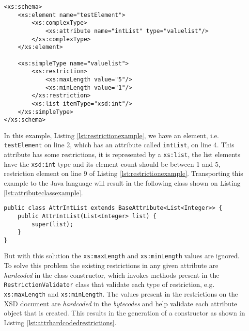 \bigskip


\begin{minipage}{\linewidth}
\begin{lstlisting}[caption={Restrictions Example XSD},captionpos=b,label={lst:restrictionexample}]
<xs:schema>
    <xs:element name="testElement">
        <xs:complexType>
            <xs:attribute name="intList" type="valuelist"/>
        </xs:complexType>
    </xs:element>
    
    <xs:simpleType name="valuelist">
        <xs:restriction>
            <xs:maxLength value="5"/>
            <xs:minLength value="1"/>
        </xs:restriction>
        <xs:list itemType="xsd:int"/>
    </xs:simpleType>
</xs:schema>
\end{lstlisting}
\end{minipage}

\noindent
In this example, Listing \ref{lst:restrictionexample}, we have an element, i.e. \texttt{testElement} on line 2, which has an attribute called \texttt{intList}, on line 4. This attribute has some restrictions, it is represented by a \texttt{xs:list}, the list elements have the \texttt{xsd:int} type and its element count should be between 1 and 5, restriction element on line 9 of Listing \ref{lst:restrictionexample}. Transporting this example to the Java language will result in the following class shown on Listing \ref{lst:attributeclassexample}.

\bigskip


\begin{minipage}{\linewidth}
\begin{lstlisting}[caption={Attribute Class Receiving a List},captionpos=b,label={lst:attributeclassexample}]
public class AttrIntList extends BaseAttribute<List<Integer>> {
    public AttrIntList(List<Integer> list) {
        super(list);
    }
}
\end{lstlisting}
\end{minipage}

\noindent
But with this solution the \texttt{xs:maxLength} and \texttt{xs:minLength} values are ignored. To solve this problem the existing restrictions in any given attribute are \textit{hardcoded} in the class constructor, which invokes methods present in the \texttt{RestrictionValidator} class that validate each type of restriction, e.g. \texttt{xs:maxLength} and \texttt{xs:minLength}. The values present in the restrictions on the \ac{XSD} document are \textit{hardcoded} in the \textit{bytecodes} and help validate each attribute object that is created. This results in the generation of a constructor as shown in Listing \ref{lst:attrhardcodedrestrictions}.

